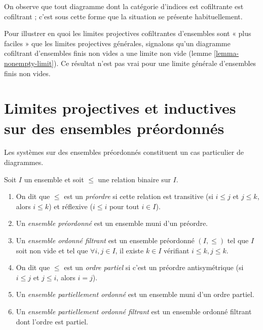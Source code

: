 \noindent
On observe que tout diagramme dont la catégorie d'indices est cofiltrante
est cofiltrant ; c'est sous cette forme que la situation se présente
habituellement.

\medskip\noindent
Pour illustrer en quoi les limites projectives cofiltrantes d'ensembles sont
« plus faciles » que les limites projectives générales, signalons qu'un
diagramme cofiltrant d'ensembles finis non vides a une limite non vide
(lemme \ref{lemma-nonempty-limit}). Ce résultat n'est pas vrai pour une
limite générale d'ensembles finis non vides.











\section{Limites projectives et inductives sur des ensembles préordonnés}
\label{section-posets-limits}

\noindent
Les systèmes sur des ensembles préordonnés constituent un cas particulier
de diagrammes.

\begin{definition}
\label{definition-directed-set}
Soit $I$ un ensemble et soit $\leq$ une relation binaire sur $I$.
\begin{enumerate}
\item On dit que $\leq$ est un {\it préordre} si cette relation est
transitive (si $i \leq j$ et $j \leq k$, alors $i \leq k$) et réflexive
($i \leq i$ pour tout $i \in I$).
\item Un {\it ensemble préordonné} est un ensemble muni d'un préordre.
\item Un {\it ensemble ordonné filtrant} est un ensemble préordonné
$(I, \leq)$ tel que $I$ soit non vide et tel que $\forall i, j \in I$,
il existe $k \in I$ vérifiant $i \leq k, j \leq k$.
\item On dit que $\leq$ est un {\it ordre partiel} si c'est un préordre
antisymétrique (si $i \leq j$ et $j \leq i$, alors $i = j$).
\item Un {\it ensemble partiellement ordonné} est un ensemble muni d'un
ordre partiel.
\item Un {\it ensemble partiellement ordonné filtrant} est un ensemble
ordonné filtrant dont l'ordre est partiel.
\end{enumerate}
\end{definition}

